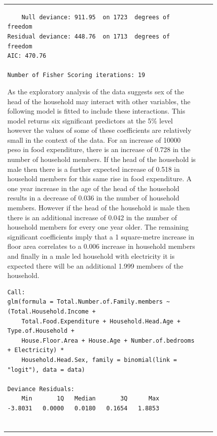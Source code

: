 \documentclass[
]{article}
\begin{document}
\begin{figure}[H]
\begin{table}[H]
\begin{tabular}[t]{lrr}
\begin{verbatim}
    Null deviance: 911.95  on 1723  degrees of freedom
Residual deviance: 448.76  on 1713  degrees of freedom
AIC: 470.76

Number of Fisher Scoring iterations: 19
\end{verbatim}

As the exploratory analysis of the data suggests sex of the head of the
household may interact with other variables, the following model is
fitted to include these interactions. This model returns six significant
predictors at the 5\% level however the values of some of these
coefficients are relatively small in the context of the data. For an
increase of 10000 peso in food expenditure, there is an increase of
0.728 in the number of household members. If the head of the household
is male then there is a further expected increase of 0.518 in household
members for this same rise in food expenditure. A one year increase in
the age of the head of the household results in a decrease of 0.036 in
the number of household members. However if the head of the household is
male then there is an additional increase of 0.042 in the number of
household members for every one year older. The remaining significant
coefficients imply that a 1 square-metre increase in floor area
correlates to a 0.006 increase in household members and finally in a
male led household with electricity it is expected there will be an
additional 1.999 members of the household.

\begin{verbatim}
Call:
glm(formula = Total.Number.of.Family.members ~ (Total.Household.Income + 
    Total.Food.Expenditure + Household.Head.Age + Type.of.Household + 
    House.Floor.Area + House.Age + Number.of.bedrooms + Electricity) * 
    Household.Head.Sex, family = binomial(link = "logit"), data = data)

Deviance Residuals: 
    Min       1Q   Median       3Q      Max  
-3.8031   0.0000   0.0180   0.1654   1.8853  


\end{verbatim}
\end{tabular}
\end{table}
\end{figure}
\end{document}
